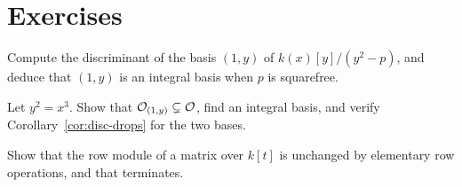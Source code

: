 \section*{Exercises}

\begin{exercise}
Compute the discriminant of the basis $(1, y)$ of $k(x)[y]/(y^2 - p)$, and
deduce that $(1, y)$ is an integral basis when $p$ is squarefree.
\end{exercise}

\begin{exercise}
Let $y^2 = x^3$. Show that $\mathcal{O}_{(1, y)} \subsetneq \mathcal{O}$, find an integral
basis, and verify Corollary~\ref{cor:disc-drops} for the two bases.
\end{exercise}

\begin{exercise}
Show that the row module of a matrix over $k[t]$ is unchanged by elementary
row operations, and that  terminates.
\end{exercise}
